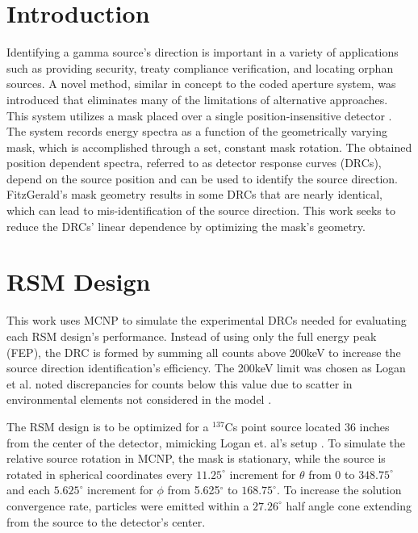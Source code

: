 \documentclass[twocolumn,10pt,final]{asme2ej}
\begin{document}
\section{Introduction}
\label{intro}
Identifying a gamma source's direction is important in a variety of applications such as providing security, treaty compliance verification, and locating orphan sources.  
A novel method, similar in concept to the coded aperture system, was introduced that eliminates many of the limitations of alternative approaches.
This system utilizes a mask placed over a single position-insensitive detector \cite{FitzGerald2015}.  
The system records energy spectra as a function of the geometrically varying mask, which is accomplished through a set, constant mask rotation. 
The obtained position dependent spectra, referred to as detector response curves (DRCs), depend on the source position and can be used to identify the source direction.  FitzGerald's mask geometry results in some DRCs that are nearly identical, which can lead to mis-identification of the source direction.  
This work seeks to reduce the DRCs' linear dependence by optimizing the mask's geometry.

\vspace{-0.3 cm}
\section{RSM Design} \label{sec:rsm-design}
This work uses MCNP to simulate the experimental DRCs needed for evaluating each RSM design's performance.  
Instead of using only the full energy peak (FEP), the DRC is formed by summing all counts above 200keV to increase the source direction identification's efficiency.  
The 200keV limit was chosen as Logan et al. noted discrepancies for counts below this value due to scatter in environmental elements not considered in the model \cite{Logan2017}.

The RSM design is to be optimized for a $^{137}$Cs point source located 36 inches from the center of the detector, mimicking Logan et. al's setup \cite{Logan2017}.  
To simulate the relative source rotation in MCNP, the mask is stationary, while the source is rotated in spherical coordinates every $11.25^\circ$ increment for $\theta$ from 0 to $348.75^\circ$ and each $5.625^\circ$ increment for $\phi$ from 5.625$^\circ$ to $168.75^\circ$.  
To increase the solution convergence rate, particles were emitted within a $27.26^\circ$ half angle cone extending from the source to the detector's center.  
\end{document}
